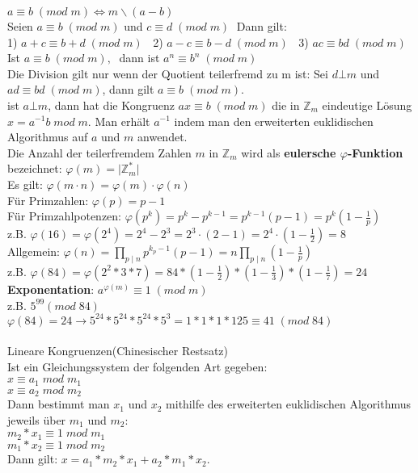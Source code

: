 \documentclass[11pt]{article}
\begin{document}
$a \equiv b \; (mod\; m) \Longleftrightarrow m \backslash (a-b)$\\
Seien $a \equiv b \; (mod\; m)$ und $c \equiv d \; (mod\; m)\; $ Dann gilt:\\
1) $a+c \equiv b+d \; (mod\; m)\; \;$ 2) $a-c \equiv b-d \; (mod\; m)\; \;$ 3) $ac \equiv bd \; (mod\; m)\; \;$\\
Ist $a \equiv b \; (mod\; m),\; $ dann ist $a^n \equiv b^n \; (mod\; m)$\\
Die Division gilt nur wenn der Quotient teilerfremd zu m ist: Sei $d \bot m$ und $ad \equiv bd \; (mod\; m)$, dann gilt $a \equiv b \; (mod\; m)$.\\
ist $a \bot m$, dann hat die Kongruenz $ax \equiv b\; (mod\; m)$ die in $\mathbb{Z}_m$ eindeutige L{\"o}sung $x=a^{-1}b\; mod\;m$. Man erh{\"a}lt $a^{-1}$ indem man den erweiterten euklidischen Algorithmus auf $a$ und $m$ anwendet.\\
Die Anzahl der teilerfremdem Zahlen $m$ in $\mathbb{Z}_m$ wird als {\bfseries eulersche $\varphi$-Funktion} bezeichnet: $\varphi (m) = \mathopen| \mathbb{Z}^{*}_m \mathclose| $\\ Es gilt: $
    \varphi (m \cdot n) = \varphi (m) \cdot \varphi (n) $\\
F{\"u}r Primzahlen: $\varphi(p) = p-1$\\
F{\"u}r Primzahlpotenzen: $\varphi(p^k) = p^k-p^{k-1} = p^{k-1}(p-1)= p^{k}\left(1-\frac1{p}\right)$\\ z.B. $\varphi(16)=\varphi(2^4)=2^4-2^3=2^3\cdot (2-1)=2^4\cdot \left(1-\frac12\right) =8 $\\
Allgemein: $\varphi(n) = \prod_{p\mid n} p^{k_p-1}(p-1) = n \prod_{p\mid n}\left(1-\frac{1}{p}\right) $\\
z.B. $\varphi (84) = \varphi (2^2*3*7)=84*(1-\frac{1}{2})*(1-\frac{1}{3})*(1-\frac{1}{7})=24$\\
{\bfseries Exponentation}: $a^{\varphi (m)} \equiv 1\;(mod\;m)$\\
z.B. $5^{99} (mod\;84)\;$\hspace{3mm}$ \varphi (84) = 24 \longrightarrow 5^{24}*5^{24}*5^{24}*5^3 = 1*1*1*125 \equiv 41\; (mod\; 84)$\\
\\
Lineare Kongruenzen(Chinesischer Restsatz)\\
Ist ein Gleichungssystem der folgenden Art gegeben:\\
$x \equiv a_1\; mod\; m_1$\\ $x \equiv a_2\; mod\; m_2$\\
Dann bestimmt man $x_1$ und $x_2$ mithilfe des erweiterten euklidischen Algorithmus jeweils {\"u}ber $m_1$ und $m_2$:\\
$m_2 * x_1 \equiv 1\; mod\; m_1$ \\ $m_1 * x_2 \equiv 1\; mod\; m_2$\\
Dann gilt: $x=a_1*m_2*x_1+a_2*m_1*x_2$.\\
\end{document}
